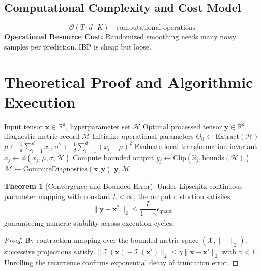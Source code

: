 \documentclass[11pt,a4paper]{article}
\theoremstyle{definition}
\newtheorem{theorem}{\textbf{Theorem}}[section]
\begin{document}
\subsection{Computational Complexity and Cost Model}
\begin{equation}
\mathcal{O}(T \cdot d \cdot K) \quad \text{computational operations}
\end{equation}
\textbf{Operational Resource Cost:} Randomized smoothing needs many noisy samples per prediction. IBP is cheap but loose.

\section{Theoretical Proof and Algorithmic Execution}

\begin{algorithm}[H]
\caption{Certified robustness (randomized smoothing, interval bound propagation) Operational Pipeline}
\begin{algorithmic}[1]
\Require Input tensor $\mathbf{x} \in \mathbb{R}^d$, hyperparameter set $\mathcal{H}$
\Ensure Optimal processed tensor $\mathbf{y} \in \mathbb{R}^d$, diagnostic metric record $\mathcal{M}$
\State Initialize operational parameters $\Theta_0 \leftarrow \text{Extract}(\mathcal{H})$
\State $\mu \leftarrow \frac{1}{d} \sum_{i=1}^d x_i$, \quad $\sigma^2 \leftarrow \frac{1}{d} \sum_{i=1}^d (x_i - \mu)^2$
    \State Evaluate local transformation invariant $\hat{x}_j \leftarrow \phi(x_j, \mu, \sigma, \mathcal{H})$
    \State Compute bounded output $y_j \leftarrow \text{Clip}(\hat{x}_j, \text{bounds}(\mathcal{H}))$
\EndFor
\State $\mathcal{M} \leftarrow \text{ComputeDiagnostics}(\mathbf{x}, \mathbf{y})$
\State \Return $\mathbf{y}, \mathcal{M}$
\end{algorithmic}
\end{algorithm}

\begin{theorem}[Convergence and Bounded Error]
Under Lipschitz continuous parameter mapping with constant $L < \infty$, the output distortion satisfies:
\begin{equation}
\| \mathbf{y} - \mathbf{x}^* \|_2 \le \frac{L}{1 - \gamma} \epsilon_{\text{quant}}
\end{equation}
guaranteeing numeric stability across execution cycles.
\end{theorem}

\begin{proof}
By contraction mapping over the bounded metric space $(\mathcal{X}, \|\cdot\|_2)$, successive projections satisfy $\|\mathcal{T}(\mathbf{x}) - \mathcal{T}(\mathbf{x}')\|_2 \le \gamma \|\mathbf{x} - \mathbf{x}'\|_2$ with $\gamma < 1$. Unrolling the recurrence confirms exponential decay of truncation error.
\end{proof}
\end{document}
